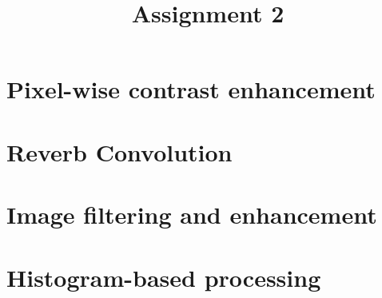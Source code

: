 \documentclass[12pt]{article}
\title{Assignment 2}
\begin{document}
\maketitle

\section{Pixel-wise contrast enhancement}


\section{Reverb Convolution}


\section{Image filtering and enhancement}


\section{Histogram-based processing}
\end{document}
